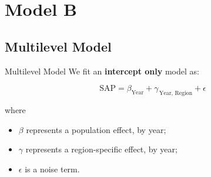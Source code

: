 \section{Model B}

\subsection{Multilevel Model}

\begin{frame}{Multilevel Model}
    We fit an \textbf{intercept only} model as:

    \begin{equation*}
        \mathrm{SAP}
            = \beta_{\mathrm{Year}}
            + \gamma_{\, \mathrm{Year}, \, \mathrm{Region}}
            + \epsilon
    \end{equation*}

    where
    
    \begin{itemize}
        \item $\beta$ represents a population effect, by year;
        \item $\gamma$ represents a region-specific effect, by year;
        \item $\epsilon$ is a noise term.
    \end{itemize}
\end{frame}


